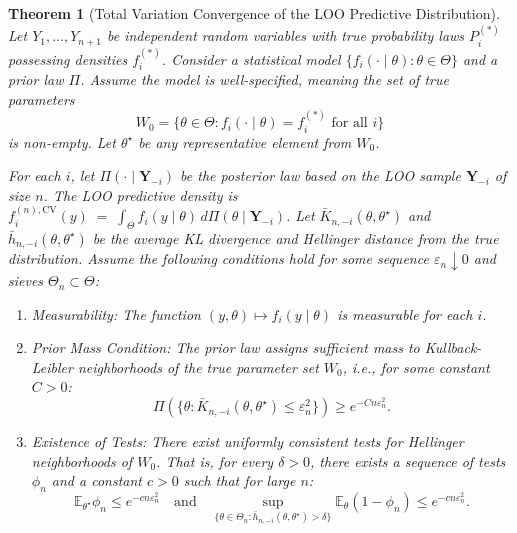 \documentclass[
  12pt]{article}
\theoremstyle{plain}
\newtheorem{theorem}{Theorem}[section]
\theoremstyle{definition}
\theoremstyle{remark}
\begin{document}
\begin{theorem}[Total Variation Convergence of the LOO Predictive Distribution]
\label{thm:loo-pred-tv-formal-w0}
Let $Y_1,\dots,Y_{n+1}$ be independent random variables with true probability laws $P_i^{(*)}$ possessing densities $f_i^{(*)}$. Consider a statistical model $\{f_i(\cdot\mid\theta):\theta\in\Theta\}$ and a prior law $\Pi$. Assume the model is well-specified, meaning the set of true parameters
\begin{equation}W_0 = \{\theta \in \Theta : f_i(\cdot \mid \theta) = f_i^{(*)} \text{ for all } i\}\end{equation}
is non-empty. Let $\theta^\star$ be any representative element from $W_0$.

For each $i$, let $\Pi(\cdot\mid\mathbf Y_{-i})$ be the posterior law based on the LOO sample $\mathbf Y_{-i}$ of size $n$. The LOO predictive density is $f_i^{(n),\mathrm{CV}}(y)\;=\;\int_{\Theta} f_i(y\mid\theta)\,d\Pi(\theta\mid\mathbf Y_{-i})$. Let $\bar K_{n,-i}(\theta,\theta^\star)$ and $\bar h_{n,-i}(\theta,\theta^\star)$ be the average KL divergence and Hellinger distance from the true distribution. Assume the following conditions hold for some sequence $\varepsilon_n\downarrow 0$ and sieves $\Theta_n \subset \Theta$:
\begin{enumerate}
    \item[\textnormal{(i)}] Measurability: The function $(y, \theta) \mapsto f_i(y \mid \theta)$ is measurable for each $i$.

    \item[\textnormal{(ii)}] Prior Mass Condition: The prior law assigns sufficient mass to Kullback-Leibler neighborhoods of the true parameter set $W_0$, i.e., for some constant $C>0$:
    \begin{equation}\Pi(\{\theta:\bar K_{n,-i}(\theta,\theta^\star)\le \varepsilon_n^2\}) \ge e^{-C n\varepsilon_n^2}.\end{equation}

    \item[\textnormal{(iii)}] Existence of Tests: There exist uniformly consistent tests for Hellinger neighborhoods of $W_0$. That is, for every $\delta>0$, there exists a sequence of tests $\phi_n$ and a constant $c>0$ such that for large $n$:
    \begin{equation} \mathbb{E}_{\theta^\star}\phi_n \le e^{-cn\varepsilon_n^2} \quad \text{and} \quad \sup_{\{\theta \in \Theta_n : \bar{h}_{n,-i}(\theta,\theta^\star) > \delta\}} \mathbb{E}_{\theta}(1-\phi_n) \le e^{-cn\varepsilon_n^2}.\end{equation}


\end{enumerate}
\end{theorem}
\end{document}
